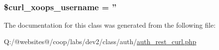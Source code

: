 \hypertarget{class_xortify_auth_rest___curl_aab7480ba9f878a02b2c9fd43922fa070}{
\subsubsection[{\$curl\-\_\-xoops\-\_\-username}]{\setlength{\rightskip}{0pt plus 5cm}\$curl\-\_\-xoops\-\_\-username = ''}}\label{class_xortify_auth_rest___curl_aab7480ba9f878a02b2c9fd43922fa070}


The documentation for this class was generated from the following file\-:\begin{DoxyCompactItemize}
\item 
Q\-:/@websites@/coop/labs/dev2/class/auth/\hyperlink{auth__rest__curl_8php}{auth\-\_\-rest\-\_\-curl.\-php}\end{DoxyCompactItemize}
